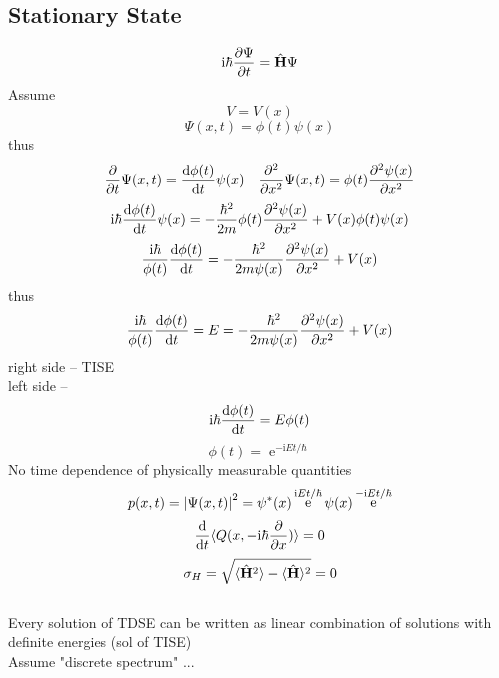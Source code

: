 \documentclass[UTF8]{ctexart} %
\DeclareMathOperator{\e}{\mathrm{e}}
\renewcommand{\I}{\mathrm{i}}
\DeclareMathOperator{\psis}{\psi^\ast}
\numberwithin{equation}{subsection}
\begin{document}
\subsection{Stationary State}
\begin{equation}\label{key}
\I\hbar\pdv{\Psi}{t} = \hat{\vb{H}}\Psi
\end{equation}
Assume
\begin{equation}\label{key}
V = V(x)
\end{equation}
\begin{equation}\label{key}
\Psi(x,t) = \phi(t)\psi(x)
\end{equation}
thus
\begin{equation}\label{key}
\pdv{t}\Psi(x,t) = \dv{\phi(t)}{t}\psi(x)  \quad \pdv[2]{x}\Psi(x,t) = \phi(t)\pdv[2]{\psi(x)}{x}
\end{equation}
\begin{equation}\label{key}
\I\hbar\dv{\phi(t)}{t}\psi(x) = -\dfrac{\hbar^2}{2m}\phi(t)\pdv[2]{\psi(x)}{x} + V(x)\phi(t)\psi(x)
\end{equation}
\begin{equation}\label{key}
\dfrac{\I\hbar}{\phi(t)}\dv{\phi(t)}{t} = -\dfrac{\hbar^2}{2m\psi(x)}\pdv[2]{\psi(x)}{x} + V(x)
\end{equation}
thus
\begin{equation}\label{key}
\dfrac{\I\hbar}{\phi(t)}\dv{\phi(t)}{t} = E = -\dfrac{\hbar^2}{2m\psi(x)}\pdv[2]{\psi(x)}{x} + V(x)
\end{equation}
right side -- TISE\\
left side --
\begin{equation}\label{key}
\I\hbar\dv{\phi(t)}{t} = E\phi(t)
\end{equation}
\begin{equation}\label{key}
\phi(t) = \e^{-\I Et/\hbar}
\end{equation}
No time dependence of physically measurable quantities
\begin{equation}\label{key}
p(x,t) = \abs{\Psi(x,t)}^2 = \psis(x)\e^{\I Et/\hbar}\psi(x)\e^{-\I Et/\hbar}
\end{equation}
\begin{equation}\label{key}
\dv{t}\langle Q(x,-\I\hbar\pdv{x})\rangle = 0
\end{equation}
\begin{equation}\label{key}
\sigma_H = \sqrt{\langle \hat{\vb{H}}^2\rangle - \langle \hat{\vb{H}}\rangle^2} = 0
\end{equation}
~\\
Every solution of TDSE can be written as linear combination of solutions with definite energies (sol of TISE)\\
Assume "discrete spectrum" ...\\
\end{document}

